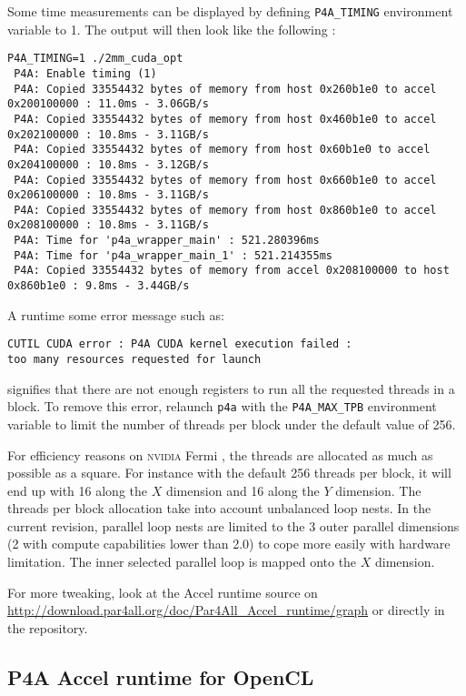 \documentclass[a4paper]{article}
\begin{document}
Some time measurements can be displayed by defining
\verb|P4A_TIMING| environment variable to 1. The output will then look like the
following : {\scriptsize
\begin{verbatim}
P4A_TIMING=1 ./2mm_cuda_opt
 P4A: Enable timing (1)
 P4A: Copied 33554432 bytes of memory from host 0x260b1e0 to accel 0x200100000 : 11.0ms - 3.06GB/s
 P4A: Copied 33554432 bytes of memory from host 0x460b1e0 to accel 0x202100000 : 10.8ms - 3.11GB/s
 P4A: Copied 33554432 bytes of memory from host 0x60b1e0 to accel 0x204100000 : 10.8ms - 3.12GB/s
 P4A: Copied 33554432 bytes of memory from host 0x660b1e0 to accel 0x206100000 : 10.8ms - 3.11GB/s
 P4A: Copied 33554432 bytes of memory from host 0x860b1e0 to accel 0x208100000 : 10.8ms - 3.11GB/s
 P4A: Time for 'p4a_wrapper_main' : 521.280396ms
 P4A: Time for 'p4a_wrapper_main_1' : 521.214355ms
 P4A: Copied 33554432 bytes of memory from accel 0x208100000 to host 0x860b1e0 : 9.8ms - 3.44GB/s
\end{verbatim}
}


A runtime some error message such as:
\begin{verbatim}
CUTIL CUDA error : P4A CUDA kernel execution failed :
too many resources requested for launch
\end{verbatim}
signifies that there are not enough registers to run all the requested
threads in a block. To remove this error,
relaunch \texttt{p4a} with the \verb|P4A_MAX_TPB| environment variable to limit the
number of threads per block under the default value of 256.

For efficiency reasons on \textsc{nvidia} Fermi \Agpu, the threads are
allocated as much as possible as a square. For instance with the default 256 
threads per block, it will end up with 16 along the $X$ dimension and 16 along
the $Y$ dimension. The threads per block allocation take into account unbalanced 
loop nests. In the current revision, parallel loop nests are limited to the 3 
outer parallel dimensions (2 with compute capabilities lower than 2.0) to cope 
more easily with \Acuda \Agpu hardware limitation. The inner selected parallel 
loop is mapped onto the $X$ \Agpu dimension.

For more tweaking, look at the \Apfa Accel runtime source on
\url{http://download.par4all.org/doc/Par4All_Accel_runtime/graph} or
directly in the \Agit repository.

\subsection{P4A Accel runtime for OpenCL}
\label{sec:p4a-accel-runtime_opencl}
\end{document}
